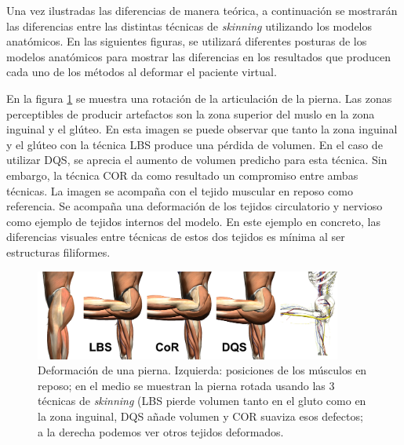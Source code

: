 Una vez ilustradas las diferencias de manera teórica, a continuación se mostrarán las diferencias entre las distintas técnicas de \emph{skinning} utilizando los modelos anatómicos. En las siguientes figuras, se utilizará diferentes posturas de los modelos anatómicos para mostrar las diferencias en los resultados que producen cada uno de los métodos al deformar el paciente virtual.

En la figura \ref{fig:thigh_bending} se muestra una rotación de la articulación de la pierna. Las zonas perceptibles de producir artefactos son la zona superior del muslo en la zona inguinal y el glúteo. En esta imagen se puede observar que tanto la zona inguinal y el glúteo con la técnica \ac{LBS} produce una pérdida de volumen. En el caso de utilizar \ac{DQS}, se aprecia el aumento de volumen predicho para esta técnica. Sin embargo, la técnica \ac{COR} da como resultado un compromiso entre ambas técnicas. La imagen se acompaña con el tejido muscular en reposo como referencia. Se acompaña una deformación de los tejidos circulatorio y nervioso como ejemplo de tejidos internos del modelo. En este ejemplo en concreto, las diferencias visuales entre técnicas de estos dos tejidos es mínima al ser estructuras filiformes. 





\begin{figure}[h]%
  \centering
  \includegraphics[width=0.90\textwidth]{IMG/compculo}
    \caption{ Deformación de una pierna. Izquierda: posiciones de los músculos en reposo; en el medio se muestran la pierna rotada usando las 3 técnicas de \emph{skinning} (\ac{LBS} pierde volumen tanto en el gluto como en la zona inguinal, \ac{DQS} añade volumen y \ac{COR} suaviza esos defectos; a la derecha podemos ver otros tejidos deformados.}
    \label{fig:thigh_bending}
\end{figure}






